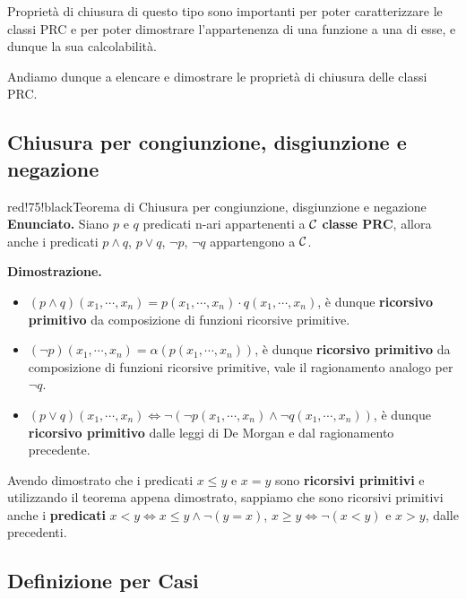 Proprietà di chiusura di questo tipo sono importanti per poter caratterizzare le classi PRC e per poter dimostrare l'appartenenza di una funzione a una di esse, e dunque la sua calcolabilità.

Andiamo dunque a elencare e dimostrare le proprietà di chiusura delle classi PRC. %

\subsection{Chiusura per congiunzione, disgiunzione e negazione}

\begin{halfframedbox}{red!75!black}{Teorema di Chiusura per congiunzione\(\text{,}\) disgiunzione e negazione}\label{Chiusure per congiunzione, disgiunzione e negazione Teorema}
  \textbf{Enunciato.} Siano \(p\) e \(q\) predicati n-ari appartenenti a \(\mathcal{C}\) \textbf{classe PRC}, allora anche i predicati \(p \land q\), \(p \lor q\), \(\neg p\), \(\neg q\) appartengono a \(\mathcal{C}\).

  \begin{center}
    \textcolor{red!75!black}{\hdashrule[0.5ex]{18cm}{1pt}{3mm 3pt 1mm 2pt}}
  \end{center}

  \textbf{Dimostrazione. }
  \begin{itemize}
    \item \((p \land q)(x_1,\cdots,x_n) = p(x_1,\cdots,x_n) \cdot q(x_1,\cdots,x_n)\), è dunque \textbf{ricorsivo primitivo} da composizione di funzioni ricorsive primitive.
    \item \((\neg p)(x_1,\cdots,x_n)=\alpha(p(x_1,\cdots,x_n))\), è dunque \textbf{ricorsivo primitivo} da composizione di funzioni ricorsive primitive, vale il ragionamento analogo per \(\neg q\).
    \item \((p \lor q)(x_1,\cdots,x_n) \iff \neg(\neg p(x_1,\cdots,x_n) \land \neg q(x_1,\cdots,x_n))\), è dunque \textbf{ricorsivo primitivo} dalle leggi di De Morgan e dal ragionamento precedente.
   \end{itemize}
\end{halfframedbox}

Avendo dimostrato che i predicati \(x \leq y\) e \(x=y\) sono \textbf{ricorsivi primitivi} e utilizzando il teorema appena dimostrato, sappiamo che sono ricorsivi primitivi anche i \textbf{predicati} \(x<y\iff x\leq y \land \neg (y= x)\), \(x\geq y\iff\neg(x<y)\) e \(x>y\), dalle precedenti.

\subsection{Definizione per Casi}

